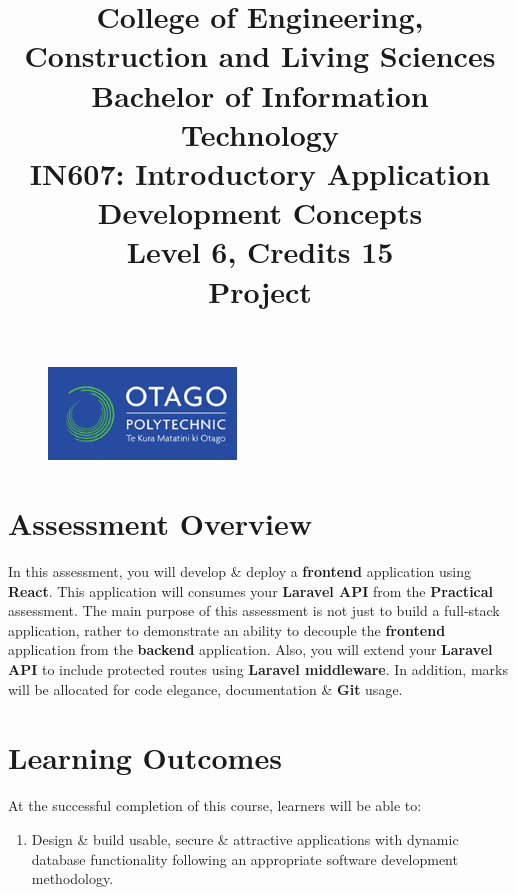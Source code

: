 \documentclass{article}
\author{}
\begin{document}
\begin{figure}
	\centering
	\includegraphics[width=50mm]{./img/logo.png}
\end{figure}

\title{College of Engineering, Construction and Living Sciences\\Bachelor of Information Technology\\IN607: Introductory Application Development Concepts\\Level 6, Credits 15\\\textbf{Project}}
\date{}
\maketitle

\section*{Assessment Overview}
In this assessment, you will develop \& deploy a \textbf{frontend} application using \textbf{React}. This application will consumes your \textbf{Laravel API} from the \textbf{Practical} assessment. The main purpose of this assessment is not just to build a full-stack application, rather to demonstrate an ability to decouple the \textbf{frontend} application from the \textbf{backend} application. Also, you will extend your \textbf{Laravel API} to include protected routes using \textbf{Laravel middleware}. In addition, marks will be allocated for code elegance, documentation \& \textbf{Git} usage.

\section*{Learning Outcomes}
At the successful completion of this course, learners will be able to:
\begin{enumerate}
	\item Design \& build usable, secure \& attractive applications with dynamic database functionality following an appropriate software development methodology.
\end{enumerate}
\end{document}
